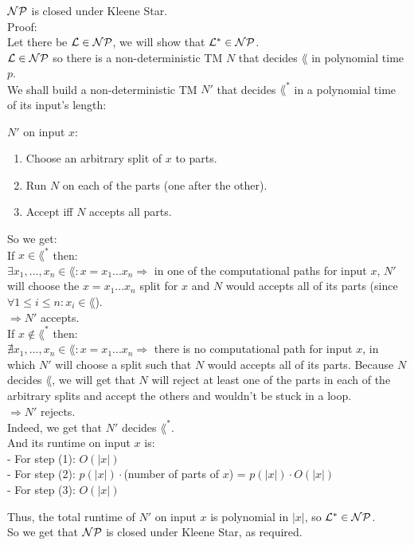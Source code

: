$\mathcal{N}\mathcal{P}$ is closed under Kleene Star. \\

Proof: \\
Let there be $\mathcal{L} \in \mathcal{N}\mathcal{P}$, we will show that $\mathcal{L}^* \in \mathcal{N}\mathcal{P}$. \\
$\mathcal{L} \in \mathcal{N}\mathcal{P}$ so there is a non-deterministic TM $N$ that decides $\lang$ in polynomial time $p$. \\
We shall build a non-deterministic TM $N'$ that decides $\lang^*$ in a polynomial time of its input's length:

$N'$ on input $x$:
\begin{enumerate}[1., itemsep=5pt]

    \item Choose an arbitrary split of $x$ to parts.

    \item Run $N$ on each of the parts (one after the other).

    \item Accept iff $N$ accepts all parts.

\end{enumerate}

So we get: \\
If $x \in \lang^*$ then: \\
$\exists x_1,...,x_n \in \lang: x=x_1...x_n \Rightarrow $ in one of the computational
paths for input $x$, $N'$ will choose the $x=x_1...x_n$ split for $x$ and $N$ would accepts all of its parts
(since $\forall 1 \leq i \leq n: x_i \in \lang$). \\
$\Rightarrow N'$ accepts. \\

If $x \notin \lang^*$ then: \\
$\nexists x_1,...,x_n \in \lang: x=x_1...x_n \Rightarrow $ there is no computational
path for input $x$, in which $N'$ will choose a split such that $N$ would accepts all of its parts.
Because $N$ decides $\lang$, we will get that $N$ will reject at least one of the parts in
each of the arbitrary splits and accept the others and wouldn't be stuck in a loop. \\
$\Rightarrow N'$ rejects. \\

Indeed, we get that $N'$ decides $\lang^*$. \\
And its runtime on input $x$ is: \\
- For step (1): $O(|x|)$ \\
- For step (2): $p(|x|) \cdot$(number of parts of $x$) = $p(|x|) \cdot O(|x|)$ \\
- For step (3): $O(|x|)$

Thus, the total runtime of $N'$ on input $x$ is polynomial in $|x|$, so $\mathcal{L}^* \in \mathcal{N}\mathcal{P}$. \\
So we get that $\mathcal{N}\mathcal{P}$ is closed under Kleene Star, as required. \\

